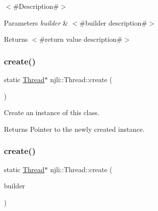 $<$\#\+Description\#$>$


\begin{DoxyParams}{Parameters}
{\em builder} & $<$\#builder description\#$>$\\
\hline
\end{DoxyParams}
\begin{DoxyReturn}{Returns}
$<$\#return value description\#$>$ 
\end{DoxyReturn}
\mbox{\label{classnjli_1_1_thread_a1d5d960366afef7d49c9798d2ee7e6f0}} 
\subsubsection{\texorpdfstring{create()}{create()}\hspace{0.1cm}{\footnotesize\ttfamily [2/3]}}
{\footnotesize\ttfamily static \mbox{\hyperlink{classnjli_1_1_thread}{Thread}}$\ast$ njli\+::\+Thread\+::create (\begin{DoxyParamCaption}{ }\end{DoxyParamCaption})\hspace{0.3cm}{\ttfamily [static]}}

Create an instance of this class.

\begin{DoxyReturn}{Returns}
Pointer to the newly created instance. 
\end{DoxyReturn}
\mbox{\label{classnjli_1_1_thread_afc6765a4e6e64e05e28013bdbc2dd38c}} 
\subsubsection{\texorpdfstring{create()}{create()}\hspace{0.1cm}{\footnotesize\ttfamily [3/3]}}
{\footnotesize\ttfamily static \mbox{\hyperlink{classnjli_1_1_thread}{Thread}}$\ast$ njli\+::\+Thread\+::create (\begin{DoxyParamCaption}\item[{const \mbox{\hyperlink{classnjli_1_1_thread_builder}{Thread\+Builder}} \&}]{builder }\end{DoxyParamCaption})\hspace{0.3cm}{\ttfamily [static]}}

